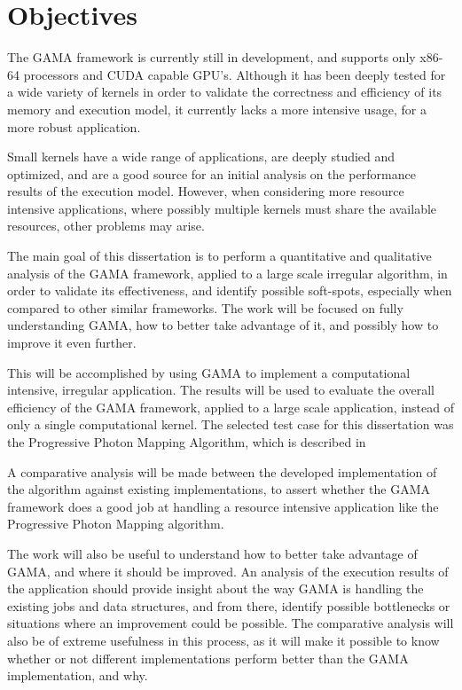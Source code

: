 \section{Objectives}

The GAMA framework is currently still in development, and supports only x86-64 processors and CUDA capable GPU's. Although it has been deeply tested for a wide variety of kernels in order to validate the correctness and efficiency of its memory and execution model, it currently lacks a more intensive usage, for a more robust application.

Small kernels have a wide range of applications, are deeply studied and optimized, and are a good source for an initial analysis on the performance results of the execution model. However, when considering more resource intensive applications, where possibly multiple kernels must share the available resources, other problems may arise.

The main goal of this dissertation is to perform a quantitative and qualitative analysis of the GAMA framework, applied to a large scale irregular algorithm, in order to validate its effectiveness, and identify possible soft-spots, especially when compared to other similar frameworks. The work will be focused on fully understanding GAMA, how to better take advantage of it, and possibly how to improve it even further. 

This will be accomplished by using GAMA to implement a computational intensive, irregular application. The results will be used to evaluate the overall efficiency of the GAMA framework, applied to a large scale application, instead of only a single computational kernel. The selected test case for this dissertation was the Progressive Photon Mapping Algorithm, which is described in 

A comparative analysis will be made between the developed implementation of the algorithm against existing implementations, to assert whether the GAMA framework does a good job at handling a resource intensive application like the Progressive Photon Mapping algorithm.

The work will also be useful to understand how to better take advantage of GAMA, and where it should be improved. An analysis of the execution results of the application should provide insight about the way GAMA is handling the existing jobs and data structures, and from there, identify possible bottlenecks or situations where an improvement could be possible.
The comparative analysis will also be of extreme usefulness in this process, as it will make it possible to know whether or not different implementations perform better than the GAMA implementation, and why. 



